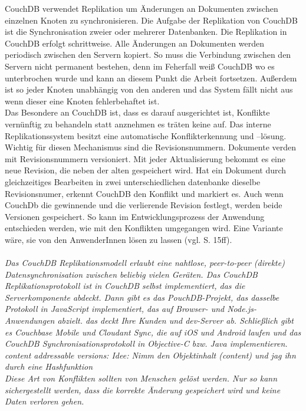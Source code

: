 CouchDB verwendet Replikation um Änderungen an Dokumenten zwischen einzelnen Knoten zu synchronisieren.
Die Aufgabe der Replikation von CouchDB ist die Synchronisation zweier oder mehrerer Datenbanken.
Die Replikation in CouchDB erfolgt schrittweise. Alle Änderungen an Dokumenten werden periodisch zwischen den Servern kopiert.
So muss die Verbindung zwischen den Servern nicht permanent bestehen, denn im Feherfall weiß CouchDB wo es unterbrochen wurde und kann an diesem Punkt die Arbeit fortsetzen.
Außerdem ist so jeder Knoten unabhängig von den anderen und das System fällt nicht aus wenn dieser eine Knoten fehlerbehaftet ist.\\
%
Das Besondere an CouchDB ist, dass es darauf ausgerichtet ist, Konflikte vernünftig zu behandeln statt anznehmen es träten keine auf.
Das interne Replikationssystem besitzt eine automatische Konflikterkennung und --lösung.
Wichtig für diesen Mechanismus sind die Revisionsnummern.
Dokumente verden mit Revisionsnummern versioniert. Mit jeder Aktualisierung bekommt es eine neue Revision, die neben der alten gespeichert wird.
Hat ein Dokument durch gleichzeitiges Bearbeiten in zwei unterschiedlichen datenbanke dieselbe Revisionsnumer, erkennt CouchDB den Konflikt und markiert es.
Auch wenn CouchDb die gewinnende und die verlierende Revision festlegt, werden beide Versionen gespeichert.
So kann im Entwicklungsprozess der Anwendung entschieden werden, wie mit den Konflikten umgegangen wird.
Eine Variante wäre, sie von den AnwenderInnen lösen zu lassen (vgl. \cite{couchDB} S. 15ff).\\\\
%
%
%
\it{Das CouchDB Replikationsmodell erlaubt eine nahtlose, peer-to-peer (direkte) Datensynchronisation zwischen beliebig vielen Geräten. Das CouchDB Replikationsprotokoll ist in CouchDB selbst implementiert, das die Serverkomponente abdeckt. Dann gibt es das PouchDB-Projekt, das dasselbe Protokoll in JavaScript implementiert, das auf Browser- und Node.js-Anwendungen abzielt. das deckt Ihre Kunden und dev-Server ab. Schließlich gibt es Couchbase Mobile und Cloudant Sync, die auf iOS und Android laufen und das CouchDB Synchronisationsprotokoll in Objective-C bzw. Java implementieren.}\\
content addressable versions: Idee: Nimm den Objektinhalt (content) und jag ihn durch eine \gls{Hashfunktion}\\
%
Diese Art von Konflikten sollten von Menschen gelöst werden. Nur so kann sichergestellt werden, dass die korrekte Änderung gespeichert wird und keine Daten verloren gehen.
